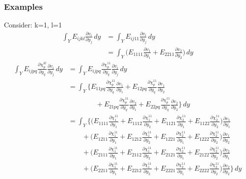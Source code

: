 \documentclass[10pt]{article}
\begin{document}
\subsubsection{Examples}
Consider: k=1, l=1
\begin{equation}\label{2drhs}
\begin{split}
\int_Y E_{ijkl}\frac{\partial v_i}{\partial y_j}\, dy &=\int_Y E_{ij11}\frac{\partial v_i}{\partial y_j}\,dy\\
&=\int_Y\bigg (E_{1111}\frac{\partial v_1}{\partial y_1}+E_{2211}\frac{\partial v_2}{\partial y_2}\bigg )\, dy
\end{split}
\end{equation}
\begin{equation}\label{2dlhs}
\begin{split}
\int_Y E_{ijpq}\frac{\partial \chi^{kl}_p}{\partial y_q}\frac{\partial v_i}{\partial y_j}\,dy &=\int_Y E_{ijpq}\frac{\partial \chi^{11}_p}{\partial y_q}\frac{\partial v_i}{\partial y_j}\,dy\\
&=\int_Y \bigg \{ E_{11pq}\frac{\partial \chi^{11}_p}{\partial y_q}\frac{\partial v_1}{\partial y_1} + E_{12pq}\frac{\partial \chi^{11}_p}{\partial y_q}\frac{\partial v_1}{\partial y_2}\\
&\qquad\qquad + E_{21pq}\frac{\partial \chi^{11}_p}{\partial y_q}\frac{\partial v_2}{\partial y_1} + E_{22pq}\frac{\partial \chi^{11}_p}{\partial y_q}\frac{\partial v_2}{\partial y_2}\bigg \}\,dy\\
&=\int_Y \bigg \{\bigg ( E_{1111}\frac{\partial \chi^{11}_1}{\partial y_1} + E_{1112}\frac{\partial \chi^{11}_1}{\partial y_2} + E_{1121}\frac{\partial \chi^{11}_2}{\partial y_1} + E_{1122}\frac{\partial \chi^{11}_2}{\partial y_2}\bigg )\frac{\partial v_1}{\partial y_1}\\
&\qquad + \bigg (E_{1211}\frac{\partial \chi^{11}_1}{\partial y_1} + E_{1212}\frac{\partial \chi^{11}_1}{\partial y_2} + E_{1221}\frac{\partial \chi^{11}_2}{\partial y_1} + E_{1222}\frac{\partial \chi^{11}_2}{\partial y_2}\bigg )\frac{\partial v_1}{\partial y_2}\\
&\qquad + \bigg (E_{2111}\frac{\partial \chi^{11}_1}{\partial y_1} + E_{2112}\frac{\partial \chi^{11}_1}{\partial y_2} + E_{2121}\frac{\partial \chi^{11}_2}{\partial y_1} + E_{2122}\frac{\partial \chi^{11}_2}{\partial y_2}\bigg )\frac{\partial v_2}{\partial y_1}\\
&\qquad + \bigg (E_{2211}\frac{\partial \chi^{11}_1}{\partial y_1} + E_{2212}\frac{\partial \chi^{11}_1}{\partial y_2} + E_{2221}\frac{\partial \chi^{11}_2}{\partial y_1} + E_{2222}\frac{\partial \chi^{11}_2}{\partial y_2}\bigg )\frac{\partial v_2}{\partial y_2}\bigg \}\,dy\\

\end{split}
\end{equation}
\end{document}
